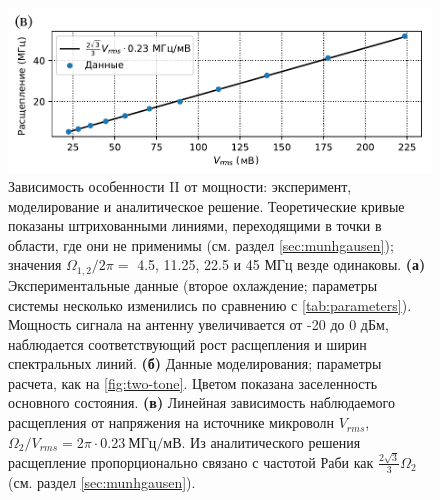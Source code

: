 \documentclass[14pt, a4paper]{extreport}
\numberwithin{equation}{section}
\begin{document}
\begin{figure}
	\centering
	\includegraphics[width=.7\linewidth]{powerscan_1d}
	\caption{Зависимость особенности II от мощности: 
		эксперимент, моделирование и аналитическое решение. Теоретические кривые показаны штрихованными линиями, переходящими в точки в области, где они не применимы (см. раздел \ref{sec:munhgausen}); значения $\Omega_{1,2}/2\pi=$ 4.5, 11.25, 22.5 
		и 45 МГц везде одинаковы. \textbf{(а)} Экспериментальные данные (второе охлаждение; параметры системы несколько изменились по сравнению с \autoref{tab:parameters}). Мощность сигнала на антенну увеличивается от -20 до 0 дБм, наблюдается соответствующий рост расщепления и ширин спектральных линий. \textbf{(б)} Данные моделирования; параметры расчета, как на \autoref{fig:two-tone}. Цветом показана заселенность основного состояния. \textbf{(в)} Линейная зависимость наблюдаемого расщепления от напряжения на источнике микроволн $V_{rms}$, ${\Omega_2}/{V_{rms}} = 2 \pi\cdot 0.23\ 
		{\text{МГц}}/{\text{мВ}}$. Из аналитического решения расщепление пропорционально связано с частотой Раби как $\frac{2\sqrt{3}}{3} \Omega_2$ (см. раздел \ref{sec:munhgausen}).}
	\label{fig:zoom}
\end{figure}
\end{document}
